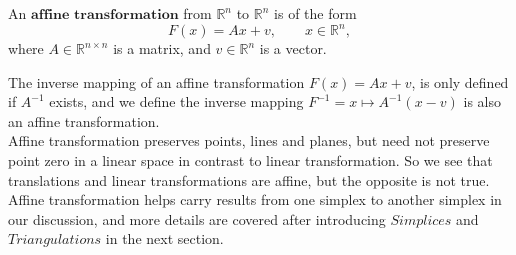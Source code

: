       \begin{definition*}
      An $\textbf{affine transformation}$ from $\mathbb{R}^n$ to $\mathbb{R}^n$ is of the form\\
      \begin{equation*}
      {F}(x) = {Ax} + {v}, \qquad {x}\in\mathbb{R}^n,
      \end{equation*}
      where ${A}\in\mathbb{R}^{n\times n}$ is a matrix, and  ${v}\in\mathbb{R}^n$ is a vector.\\
      \end{definition*}
      The inverse mapping of an affine transformation $F(x) = Ax + v$, is only defined if $A^{-1}$ exists, and we define the inverse mapping $F^{-1} = {x} \mapsto {A}^{-1}({x} - {v})$ is also an affine transformation.\\
      Affine transformation preserves points, lines and planes, but need not preserve point zero in a linear space in contrast to linear transformation. So we see that translations and linear transformations are affine, but the opposite is not true. Affine transformation helps carry results from one simplex to another simplex in our discussion, and more details are covered after introducing ${Simplices}$ and ${Triangulations}$ in the next section.


